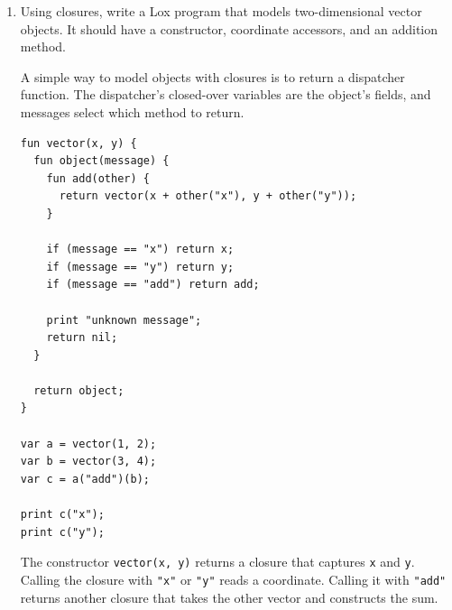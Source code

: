 \documentclass{article}
\begin{document}
\begin{enumerate}
    \item {
        Using closures, write a Lox program that models two-dimensional vector
        objects. It should have a constructor, coordinate accessors, and an addition
        method.

        A simple way to model objects with closures is to return a dispatcher function.
        The dispatcher's closed-over variables are the object's fields, and messages
        select which method to return.

        \begin{verbatim}
fun vector(x, y) {
  fun object(message) {
    fun add(other) {
      return vector(x + other("x"), y + other("y"));
    }

    if (message == "x") return x;
    if (message == "y") return y;
    if (message == "add") return add;

    print "unknown message";
    return nil;
  }

  return object;
}

var a = vector(1, 2);
var b = vector(3, 4);
var c = a("add")(b);

print c("x");
print c("y");
        \end{verbatim}

        The constructor \texttt{vector(x, y)} returns a closure that captures
        \texttt{x} and \texttt{y}. Calling the closure with \texttt{"x"} or \texttt{"y"}
        reads a coordinate. Calling it with \texttt{"add"} returns another closure
        that takes the other vector and constructs the sum.
    }
\end{enumerate}
\end{document}
